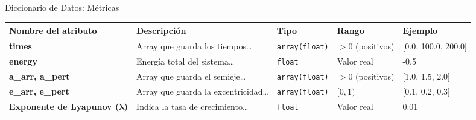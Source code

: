 \begin{frame}{Diccionario de Datos: Métricas}
  \centering
  \label{tab:diccionario_métricas_slide}
  \begin{adjustbox}{max width=0.9\textwidth}
    \begin{tabular}{@{}p{3cm} p{4cm} p{2.5cm} p{1.5cm} p{2.5cm}@{}}
      \toprule
      \textbf{Nombre del atributo} & \textbf{Descripción} & \textbf{Tipo} & \textbf{Rango} & \textbf{Ejemplo} \\
      \midrule
      \textbf{times} & Array que guarda los tiempos\ldots & \texttt{array(float)} & \(>0\) (positivos) & [0.0, 100.0, 200.0] \\
      \midrule
      \textbf{energy} & Energía total del sistema\ldots & \texttt{float} & Valor real & -0.5 \\
      \midrule
      \textbf{a\_arr, a\_pert} & Array que guarda el semieje\ldots & \texttt{array(float)} & \(>0\) (positivos) & [1.0, 1.5, 2.0] \\
      \midrule
      \textbf{e\_arr, e\_pert} & Array que guarda la excentricidad\ldots & \texttt{array(float)} & $[0, 1)$ & [0.1, 0.2, 0.3] \\
      \midrule
      \textbf{Exponente de Lyapunov ($\mathbf{\lambda}$)}& Indica la tasa de crecimiento\ldots & \texttt{float} & Valor real & 0.01 \\
      \bottomrule
    \end{tabular}
  \end{adjustbox}
\end{frame}